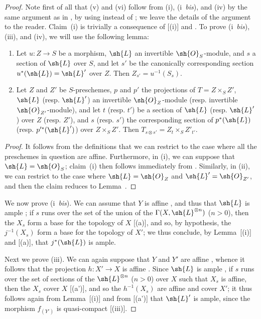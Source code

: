 \begin{proof}
Note first of all that (v) and (vi) follow from (i), (i~\emph{bis}), and (iv) by the same argument as in , by using  instead of ;
we leave the details of the argument to the reader.
Claim~(i) is trivially a consequence of [(i)] and .
To prove (i~\emph{bis}), (iii), and (iv), we will use the following lemma:
  \begin{lemma}[4.6.13.1]
  \label{II.4.6.13.1}
  \begin{enumerate}
    \item[\rm{(i)}] Let $u:Z\to S$ be a morphism, $\sh{L}$ an invertible $\sh{O}_S$-module, and $s$ a section of $\sh{L}$ over $S$, and let $s'$ be the canonically corresponding section $u^*(\sh{L})=\sh{L}'$ over $Z$.
      Then $Z_{s'}=u^{-1}(S_s)$.
    \item[\rm{(ii)}] Let $Z$ and $Z'$ be $S$-preschemes, $p$ and $p'$ the projections of $T=Z\times_S Z'$, $\sh{L}$ (resp. $\sh{L}'$) an invertible $\sh{O}_Z$-module (resp. invertible $\sh{O}_{Z'}$-module), and let $t$ (resp. $t'$) be a section of $\sh{L}$ (resp. $\sh{L}'$) over $Z$ (resp. $Z'$), and $s$ (resp. $s'$) the corresponding section of $p^*(\sh{L})$ (resp. $p'^*(\sh{L}')$) over $Z\times_S Z'$.
      Then $T_{s\otimes s'}=Z_t\times_S Z'_{t'}$.
  \end{enumerate}
  \end{lemma}

  \begin{proof}
  It follows from the definitions that we can restrict to the case where all the preschemes in question are affine.
  Furthermore, in (i), we can suppose that $\sh{L}=\sh{O}_S$;
  claim~(i) then follows immediately from .
  Similarly, in (ii), we can restrict to the case where $\sh{L}=\sh{O}_Z$ and $\sh{L}'=\sh{O}_{Z'}$, and then the claim reduces to Lemma~.
  \end{proof}

We now prove (i~\emph{bis}).
We can assume that $Y$ is affine , and thus that $\sh{L}$ is ample ;
if $s$ runs over the set of the union of the $\Gamma(X,\sh{L}^{\otimes n})$ ($n>0$), then the $X_s$ form a base for the topology of $X$ [(a)], and so, by hypothesis, the $j^{-1}(X_s)$ form a base for the topology of $X'$;
we thus conclude, by Lemma~[(i)] and [(a)], that $j^*(\sh{L})$ is ample.

Next we prove (iii).
We can again suppose that $Y$ and $Y'$ are affine , whence it follows that the projection $h:X'\to X$ is affine .
Since $\sh{L}$ is ample , if $s$ runs over the set of sections of the $\sh{L}^{\otimes n}$ ($n>0$) over $X$ such that $X_s$ is affine, then the $X_s$ cover $X$ [(a')], and so the $h^{-1}(X_s)$ are affine  and cover $X'$;
it thus follows again from Lemma~[(i)] and from [(a')] that $\sh{L}'$ is ample, since the morphism $f_{(Y')}$ is quasi-compact [(iii)].


\end{proof}
